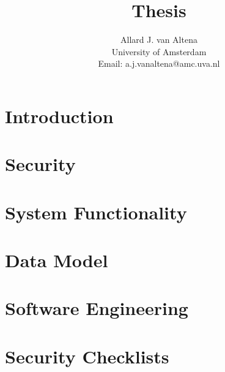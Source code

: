 \documentclass[a4paper]{report}
\title{Thesis}
\author{
	Allard J. van Altena\\
	University of Amsterdam\\
	Email: a.j.vanaltena@amc.uva.nl
}
\newif\ifstructure
\begin{document}
	
	
	\chapter{Introduction}
	\label{introduction}
	
	\ifstructure
		
	\else
		
	\fi

	\chapter{Security}
	\label{security}
	
	\ifstructure
		
	\else
		
		
		
	\fi
	
	\chapter{System Functionality}
	\label{system-functionality}
	
	\ifstructure
			
	\else
		
	\fi
	
	\chapter{Data Model}
	\label{datamodel}
	
	\ifstructure
		
	\else
		
		
	\fi
	
	\chapter{Software Engineering}
	\label{engineering}
	
	\ifstructure
			
	\else
		
	\fi
	
	\clearpage
	
	
	\appendix
	\chapter{Security Checklists}
	\label{security-appendix}
	\ifstructure
	\else 
		
	\fi
\end{document}

